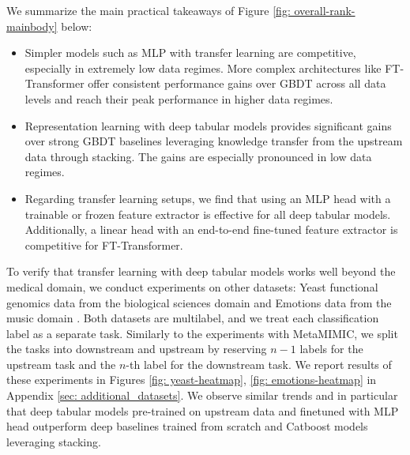 We summarize the main practical takeaways of Figure \ref{fig: overall-rank-mainbody} below:

\begin{itemize}
    \item Simpler models such as MLP with transfer learning are competitive, especially in extremely low data regimes. More complex architectures like FT-Transformer offer consistent performance gains over GBDT across all data levels and reach their peak performance in higher data regimes.

    \item Representation learning with deep tabular models provides significant gains over strong GBDT baselines leveraging knowledge transfer from the upstream data through stacking. The gains are especially pronounced in low data regimes. 

    \item Regarding transfer learning setups, we find that using an MLP head with a trainable or frozen feature extractor is effective for all deep tabular models. Additionally, a linear head with an end-to-end fine-tuned feature extractor is competitive for FT-Transformer. 

\end{itemize}

To verify that transfer learning with deep tabular models works well beyond the medical domain, we conduct experiments on other datasets: Yeast functional genomics data from the biological sciences domain \citep{elisseeff2001kernel} and Emotions data from the music domain \citep{trohidis2008multi}. Both datasets are multilabel, and we treat each classification label as a separate task. Similarly to the experiments with MetaMIMIC, we split the tasks into downstream and upstream by reserving $n-1$ labels for the upstream task and the $n$-th label for the downstream task. We report results of these experiments in Figures \ref{fig: yeast-heatmap}, \ref{fig: emotions-heatmap} in Appendix \ref{sec: additional_datasets}. We observe similar trends and in particular that deep tabular models pre-trained on upstream data and finetuned with MLP head outperform deep baselines trained from scratch and Catboost models leveraging stacking. 

